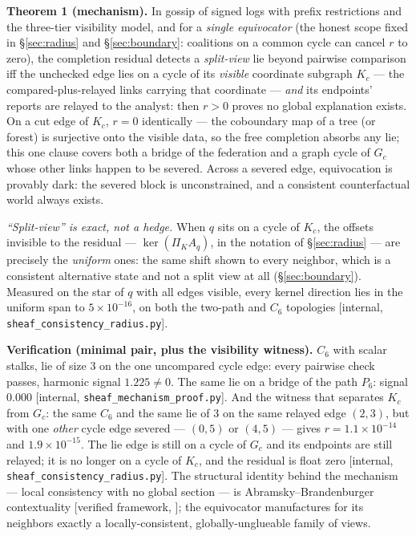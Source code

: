 \documentclass[11pt,a4paper]{article}
\begin{document}
\begin{thebox}
\textbf{Theorem 1 (mechanism).} In gossip of signed logs with prefix restrictions and the three-tier visibility model, and
for a \emph{single equivocator} (the honest scope fixed in \S\ref{sec:radius} and \S\ref{sec:boundary}: coalitions on a
common cycle can cancel $r$ to zero), the completion residual detects a \emph{split-view} lie beyond pairwise comparison
iff the unchecked edge lies on a cycle of its \emph{visible} coordinate subgraph $K_c$ --- the compared-plus-relayed links
carrying that coordinate --- \emph{and} its endpoints' reports are relayed to the analyst: then $r>0$ proves no global
explanation exists. On a cut edge of $K_c$, $r=0$ identically --- the coboundary map of a tree (or forest) is surjective
onto the visible data, so the free completion absorbs any lie; this one clause covers both a bridge of the federation and a
graph cycle of $G_c$ whose other links happen to be severed. Across a severed edge, equivocation is provably dark: the
severed block is unconstrained, and a consistent counterfactual world always exists.

\emph{``Split-view'' is exact, not a hedge.} When $q$ sits on a cycle of $K_c$, the offsets invisible to the residual ---
$\ker(\Pi_K A_q)$, in the notation of \S\ref{sec:radius} --- are precisely the \emph{uniform} ones: the same shift shown to
every neighbor, which is a consistent alternative state and not a split view at all (\S\ref{sec:boundary}). Measured on the
star of $q$ with all edges visible, every kernel direction lies in the uniform span to $5\times10^{-16}$, on both the
two-path and $C_6$ topologies [internal, \texttt{sheaf\_consistency\_radius.py}].

\textbf{Verification (minimal pair, plus the visibility witness).} $C_6$ with scalar stalks, lie of size $3$ on the one
uncompared cycle edge: every pairwise check passes, harmonic signal $1.225\ne 0$. The same lie on a bridge of the path
$P_6$: signal $0.000$ [internal, \texttt{sheaf\_mechanism\_proof.py}]. And the witness that separates $K_c$ from $G_c$:
the same $C_6$ and the same lie of $3$ on the same relayed edge $(2,3)$, but with one \emph{other} cycle edge severed ---
$(0,5)$ or $(4,5)$ --- gives $r=1.1\times10^{-14}$ and $1.9\times10^{-15}$. The lie edge is still on a cycle of $G_c$ and
its endpoints are still relayed; it is no longer on a cycle of $K_c$, and the residual is float zero
[internal, \texttt{sheaf\_consistency\_radius.py}]. The structural identity behind the mechanism --- local consistency with no
global section --- is Abramsky--Brandenburger contextuality [verified framework, \cite{abramsky-brandenburger}]; the
equivocator manufactures for its neighbors exactly a locally-consistent, globally-unglueable family of views.
\end{thebox}
\end{document}
